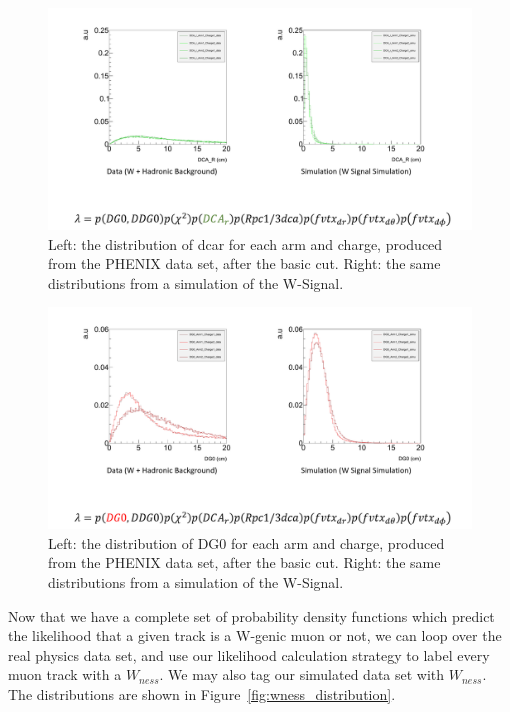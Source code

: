 \begin{figure}
  \centering
  \includegraphics[width=\linewidth,trim=4 4 4 4,clip]{./figures/pdf_dcar.png}
  \caption{
    Left: the distribution of dcar for each arm and charge, produced from the
    PHENIX data set, after the basic cut. Right: the same distributions from a
    simulation of the W-Signal.
  }
  \label{fig:pdf_dcar}
\end{figure}

\begin{figure}
  \centering
  \includegraphics[width=\linewidth,trim=4 4 4 4,clip]{./figures/pdf_DG0.png}
  \caption{
    Left: the distribution of DG0 for each arm and charge, produced from the
    PHENIX data set, after the basic cut. Right: the same distributions from a
    simulation of the W-Signal.
  }
  \label{fig:pdf_DG0}
\end{figure}

Now that we have a complete set of probability density functions which predict
the likelihood that a given track is a W-genic muon or not, we can loop over the
real physics data set, and use our likelihood calculation strategy to label
every muon track with a $W_{ness}$. We may also tag our simulated data set with
$W_{ness}$. The distributions are shown in
Figure~\ref{fig:wness_distribution}.

